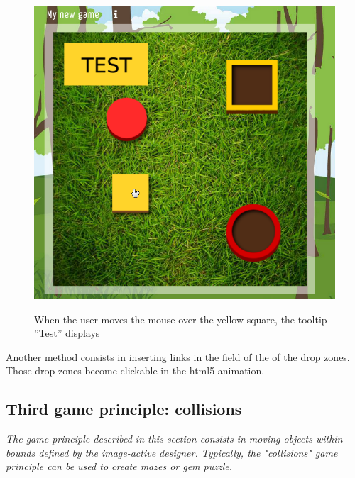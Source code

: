 \begin{figure}[htp]
 \centering
 \caption{When the user moves the mouse over the yellow square, the tooltip ''Test'' displays}
 \includegraphics[width=\textwidth]{images/tooltip_example}
 \label{tooltip_example}
\end{figure}

Another method consists in inserting links in the  field of the  
of the drop zones. Those drop zones become clickable in the html5 animation.

\subsection{Third game principle: collisions}

\textit{The game principle described in this section consists in moving objects
within bounds defined by the image-active designer. Typically, the "collisions" game principle
can be used to create mazes or gem puzzle.}




